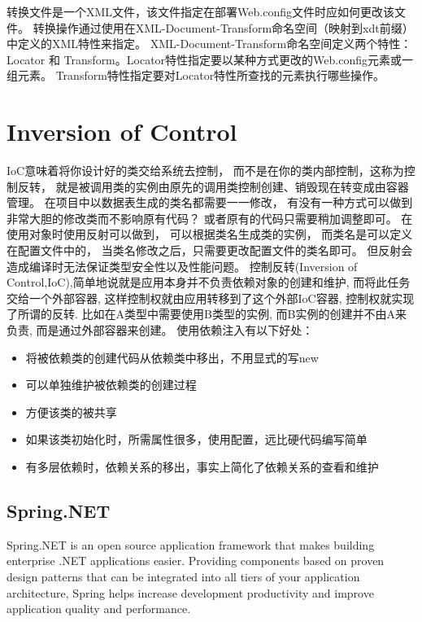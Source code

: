 \documentclass{book}
\newcounter{coderemarks}   %
\newcounter{codevar}     %
\newcommand{\circlemark}[1]{%
\tikz\node[text=white,font=\sffamily\bfseries,inner sep=0.2mm,draw,circle,fill=black]{#1};}
\newcommand{\showremarks}{%
\begin{list}{\circlemark{\arabic{codevar}}} %
{} %
\whiledo{\value{codevar} < \value{coderemarks}}{ %
\item \expandafter\csname codebox\the\value{codevar}\endcsname %
\stepcounter{codevar}} %
\end{list} %
\setcounter{coderemarks}{1}%
\setcounter{codevar}{1}%
}
\begin{document}
\showremarks

转换文件是一个XML文件，该文件指定在部署Web.config文件时应如何更改该文件。
转换操作通过使用在XML-Document-Transform命名空间（映射到xdt前缀）中定义的XML特性来指定。
XML-Document-Transform命名空间定义两个特性：
Locator 和 Transform。Locator特性指定要以某种方式更改的Web.config元素或一组元素。
Transform特性指定要对Locator特性所查找的元素执行哪些操作。

\section{Inversion of Control}

IoC意味着将你设计好的类交给系统去控制，
而不是在你的类内部控制，这称为控制反转，
就是被调用类的实例由原先的调用类控制创建、销毁现在转变成由容器管理。
在项目中以数据表生成的类名都需要一一修改，
有没有一种方式可以做到非常大胆的修改类而不影响原有代码？
或者原有的代码只需要稍加调整即可。
在使用对象时使用反射可以做到，
可以根据类名生成类的实例，
而类名是可以定义在配置文件中的，
当类名修改之后，只需要更改配置文件的类名即可。
但反射会造成编译时无法保证类型安全性以及性能问题。
控制反转(Inversion of Control,IoC),简单地说就是应用本身并不负责依赖对象的创建和维护,
而将此任务交给一个外部容器,
这样控制权就由应用转移到了这个外部IoC容器,
控制权就实现了所谓的反转.
比如在A类型中需要使用B类型的实例,
而B实例的创建并不由A来负责,
而是通过外部容器来创建。
使用依赖注入有以下好处：

\begin{itemize}
\item{将被依赖类的创建代码从依赖类中移出，不用显式的写new}
\item{可以单独维护被依赖类的创建过程}
\item{方便该类的被共享}
\item{如果该类初始化时，所需属性很多，使用配置，远比硬代码编写简单}
\item{有多层依赖时，依赖关系的移出，事实上简化了依赖关系的查看和维护}
\end{itemize}


\subsection{Spring.NET}

Spring.NET is an open source application framework 
that makes building  enterprise .NET applications easier.
Providing components based on proven design patterns 
that can be integrated into all tiers of your application architecture, 
Spring helps increase development productivity and improve application 
quality and performance.
\end{document}
